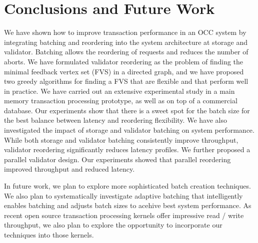 \section{Conclusions and Future Work}\label{sec:conclusion}
We have shown how to improve transaction performance in an OCC system by integrating batching and reordering into the system architecture at storage and validator. Batching allows the reordering of requests and reduces the number of aborts. We have formulated validator reordering as the problem of finding the minimal feedback vertex set (FVS) in a directed graph, and we have proposed two greedy algorithms for finding a FVS that are flexible and that perform well in practice. We have carried out an extensive experimental study in a main memory transaction processing prototype, as well as on top of a commercial database. Our experiments show that there is a sweet spot for the batch size for the best balance between latency and reordering flexibility. We have also investigated the impact of storage and validator batching on system performance. While both storage and validator batching consistently improve throughput, validator reordering significantly reduces latency profiles. We further proposed a parallel validator design. Our experiments showed that parallel reordering improved  throughput and reduced latency.

In future work, we plan to explore more sophisticated batch creation techniques. We also plan to systematically investigate adaptive batching that intelligently enables batching and adjusts batch sizes to acehive best system performance. As recent open source transaction processing kernels offer impressive
read / write throughput, we also plan to explore the opportunity to incorporate our techniques into those kernels.
